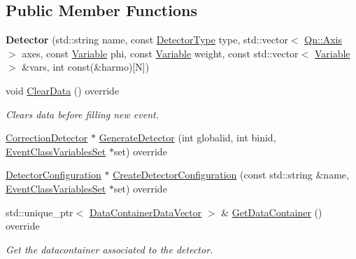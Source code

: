 \subsection*{Public Member Functions}
\begin{DoxyCompactItemize}
\item 
\mbox{\label{classQn_1_1Detector_ab47355f8ca0c2e5ed0efdca409db1e3f}} 
{\bfseries Detector} (std\+::string name, const \mbox{\hyperlink{namespaceQn_adba56b19bd9207127cdc7227d9e03a05}{Detector\+Type}} type, std\+::vector$<$ \mbox{\hyperlink{classQn_1_1Axis}{Qn\+::\+Axis}} $>$ axes, const \mbox{\hyperlink{classQn_1_1Variable}{Variable}} phi, const \mbox{\hyperlink{classQn_1_1Variable}{Variable}} weight, const std\+::vector$<$ \mbox{\hyperlink{classQn_1_1Variable}{Variable}} $>$ \&vars, int const(\&harmo)\mbox{[}N\mbox{]})
\item 
\mbox{\label{classQn_1_1Detector_ab2e924f436158be1e6f7c1930117e82c}} 
void \mbox{\hyperlink{classQn_1_1Detector_ab2e924f436158be1e6f7c1930117e82c}{Clear\+Data}} () override
\begin{DoxyCompactList}\small\item\em Clears data before filling new event. \end{DoxyCompactList}\item 
\mbox{\hyperlink{classQn_1_1CorrectionDetector}{Correction\+Detector}} $\ast$ \mbox{\hyperlink{classQn_1_1Detector_a577f9c03f000ddab3fd0a2d69e02fc68}{Generate\+Detector}} (int globalid, int binid, \mbox{\hyperlink{classQn_1_1EventClassVariablesSet}{Event\+Class\+Variables\+Set}} $\ast$set) override
\item 
\mbox{\hyperlink{classQn_1_1DetectorConfiguration}{Detector\+Configuration}} $\ast$ \mbox{\hyperlink{classQn_1_1Detector_abf5ba68165d2e037b7c21911230ed288}{Create\+Detector\+Configuration}} (const std\+::string \&name, \mbox{\hyperlink{classQn_1_1EventClassVariablesSet}{Event\+Class\+Variables\+Set}} $\ast$set) override
\item 
std\+::unique\+\_\+ptr$<$ \mbox{\hyperlink{classQn_1_1DataContainer}{Data\+Container\+Data\+Vector}} $>$ \& \mbox{\hyperlink{classQn_1_1Detector_a3f08381bad2b1452a0209e420b99e989}{Get\+Data\+Container}} () override
\begin{DoxyCompactList}\small\item\em Get the datacontainer associated to the detector. \end{DoxyCompactList}\item 

\end{DoxyCompactItemize}
